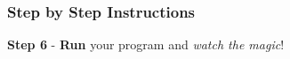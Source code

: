 \documentclass[fleqn]{beamer} %
\newcommand{\sectionIIIsubsectionIIItitle}{Step by Step Instructions}
\newcommand{\sectionIIIsubsectionIVtitle}{-}
\begin{document}
			\begin{frame}
				\frametitle{\sectionIIIsubsectionIIItitle}
				\bigskip

				\textbf{Step 6} - {\bf Run} your program and {\it watch the magic}!
				
				\btVFill
			\end{frame}


				
\end{document}
